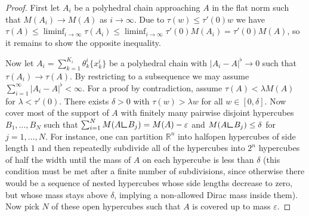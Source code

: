 \documentclass[10pt,a4paper,oneside,final]{article}
\newcommand{\R}{{\mathbb{R}}}
\newcommand{\restr}{{\mbox{\LARGE$\llcorner$}}}
\newcommand{\mass}[1]{M(#1)}
\newcommand{\flatNorm}[1]{|#1|^\flat}
\numberwithin{equation}{section}
\theoremstyle{plain}
\theoremstyle{definition}
\theoremstyle{remark}
\newcommand{\notinclude}[1]{}
\begin{document}
\begin{proof}
First let $A_i$ be a polyhedral chain approaching $A$ in the flat norm such that $\mass{A_i}\to\mass{A}$ as $i\to\infty$.
Due to $\tau(w)\leq\tau'(0)w$ we have $\tau(A)\leq\liminf_{i\to\infty}\tau(A_i)\leq\liminf_{i\to\infty}\tau'(0)\mass{A_i}=\tau'(0)\mass{A}$,
so it remains to show the opposite inequality.

Now let $A_i=\sum_{k=1}^{K_i}\theta_k^i\{x_k^i\}\notinclude{=\sum_{k=1}^{K_i}\theta_k^i\delta_{x_k^i}}$ be a polyhedral chain with $\flatNorm{A_i-A}\to0$ such that $\tau(A_i)\to\tau(A)$.
By restricting to a subsequence we may assume $\sum_{i=1}^\infty\flatNorm{A_i-A}<\infty$.
For a proof by contradiction, assume $\tau(A)<\lambda\mass{A}$ for $\lambda<\tau'(0)$.
There exists $\delta>0$ with $\tau(w)>\lambda w$ for all $w\in[0,\delta]$.
Now cover most of the support of $A$ with finitely many \notinclude{open, }pairwise disjoint hypercubes $B_1,\ldots,B_N$
such that $\sum_{i=1}^N\mass{A\restr B_j}=\mass{A}-\varepsilon$ and $\mass{A\restr B_j}\leq\delta$ for $j=1,\ldots,N$.
For instance, one can partition $\R^n$ into halfopen hypercubes of side length $1$
and then repeatedly subdivide all of the hypercubes into $2^n$ hypercubes of half the width until the mass of $A$ on each hypercube is less than $\delta$
(this condition must be met after a finite number of subdivisions,
since otherwise there would be a sequence of nested hypercubes whose side lengths decrease to zero, but whose mass stays above $\delta$, implying a non-allowed Dirac mass inside them).
\notinclude{Since $A$ is diffuse, the mass inside each hypercube does not change when only considering its interior.}%
Now pick $N$ of these open hypercubes such that $A$ is covered up to mass $\varepsilon$.


\end{proof}
\end{document}
